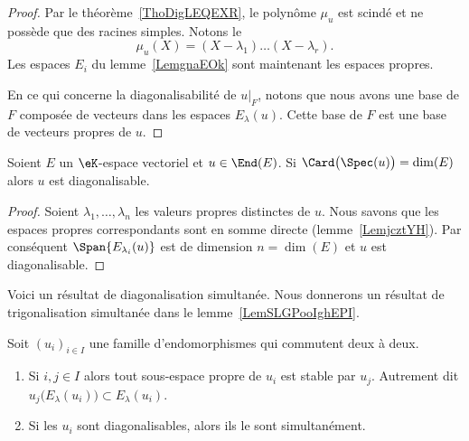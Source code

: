 \begin{proof}
    Par le théorème~\ref{ThoDigLEQEXR}, le polynôme \( \mu_u\) est scindé et ne possède que des racines simples. Notons le
    \begin{equation}
        \mu_u(X)=(X-\lambda_1)\ldots (X-\lambda_r).
    \end{equation}
    Les espaces \( E_i\) du lemme~\ref{LemgnaEOk} sont maintenant les espaces propres.

    En ce qui concerne la diagonalisabilité de \( u|_F\), notons que nous avons une base de \( F\) composée de vecteurs dans les espaces \( E_{\lambda}(u)\). Cette base de \( F\) est une base de vecteurs propres de \( u\).
\end{proof}

\begin{lemma}
    Soient \( E\) un \( \eK\)-espace vectoriel et \( u\in\End(E)\). Si \( \Card\big( \Spec(u) \big)=\dim(E)\) alors \( u\) est diagonalisable.
\end{lemma}

\begin{proof}
    Soient \( \lambda_1,\ldots, \lambda_n\) les valeurs propres distinctes de \( u\). Nous savons que les espaces propres correspondants sont en somme directe (lemme~\ref{LemjcztYH}). Par conséquent \( \Span\{ E_{\lambda_i}(u) \}\) est de dimension \( n=\dim(E)\) et \( u\) est diagonalisable.
\end{proof}

Voici un résultat de diagonalisation simultanée. Nous donnerons un résultat de trigonalisation simultanée dans le lemme~\ref{LemSLGPooIghEPI}.
\begin{proposition}     \label{PropGqhAMei}
    Soit \( (u_i)_{i\in I}\) une famille d'endomorphismes qui commutent deux à deux.
    \begin{enumerate}
        \item       \label{ItemGqhAMei}
            Si \( i,j\in I\) alors tout sous-espace propre de \( u_i\) est stable par \( u_j\). Autrement dit \( u_j\big(E_{\lambda}(u_i)\big)\subset E_{\lambda}(u_i)\).
        \item
            Si les \( u_i\) sont diagonalisables, alors ils le sont simultanément.
    \end{enumerate}
\end{proposition}

